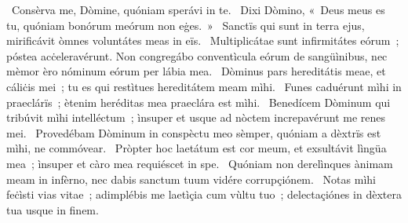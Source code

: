 ~Consèrva me, Dòmine, quóniam sperávi in te. 
~Dixi Dòmino, «~Deus meus es tu, quóniam bonórum meórum non eġes.~»
~Sanctïs qui sunt in terra ejus, mirificávit òmnes voluntátes meas in eïs. 
~Multiplicátae sunt infirmitátes eórum~; póstea acċeleravérunt. Non congregábo conventìcula eórum de sangüìnibus, nec mèmor èro nóminum eórum per lábia mea. 
~Dòminus pars hereditátis meae, et cáliċis mei~; tu es qui restìtues hereditátem meam mìhi. 
~Funes caduérunt mìhi in praeclárïs~; ètenim heréditas mea praeclára est mìhi. 
~Benedícem Dòminum qui tribúvit mìhi intelléctum~; ìnsuper et usque ad nòctem increpavérunt me renes mei. 
~Provedébam Dòminum in conspèctu meo sèmper, quóniam a dèxtrïs est mìhi, ne commóvear. 
~Pròpter hoc laetátum est cor meum, et exsultávit lìngüa mea~; ìnsuper et càro mea requiéscet in spe. 
~Quóniam non derelìnques ànimam meam in infèrno, nec dabis sanctum tuum vidére corrupçiónem. 
~Notas mìhi feċìsti vias vitae~; adimplébis me laetìçia cum vùltu tuo~; delectaçiónes in dèxtera tua usque in finem. 
